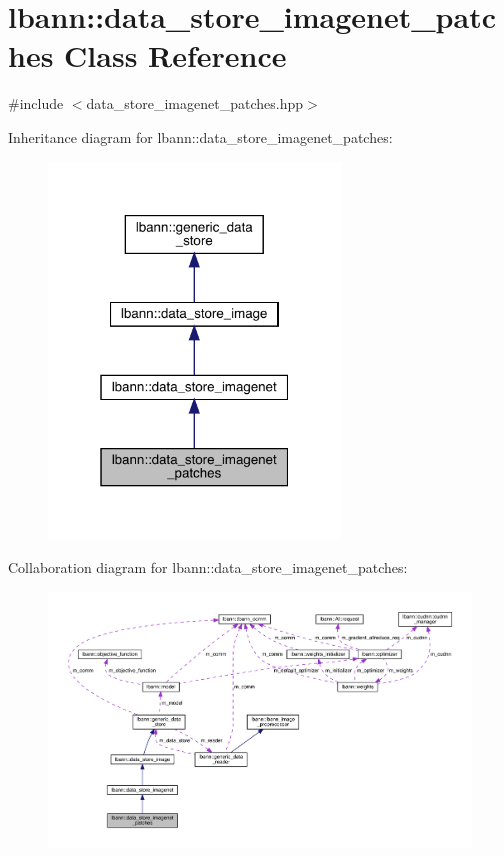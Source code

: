 \hypertarget{classlbann_1_1data__store__imagenet__patches}{}\section{lbann\+:\+:data\+\_\+store\+\_\+imagenet\+\_\+patches Class Reference}
\label{classlbann_1_1data__store__imagenet__patches}


{\ttfamily \#include $<$data\+\_\+store\+\_\+imagenet\+\_\+patches.\+hpp$>$}



Inheritance diagram for lbann\+:\+:data\+\_\+store\+\_\+imagenet\+\_\+patches\+:\nopagebreak
\begin{figure}[H]
\begin{center}
\leavevmode
\includegraphics[width=220pt]{classlbann_1_1data__store__imagenet__patches__inherit__graph}
\end{center}
\end{figure}


Collaboration diagram for lbann\+:\+:data\+\_\+store\+\_\+imagenet\+\_\+patches\+:\nopagebreak
\begin{figure}[H]
\begin{center}
\leavevmode
\includegraphics[width=350pt]{classlbann_1_1data__store__imagenet__patches__coll__graph}
\end{center}
\end{figure}
